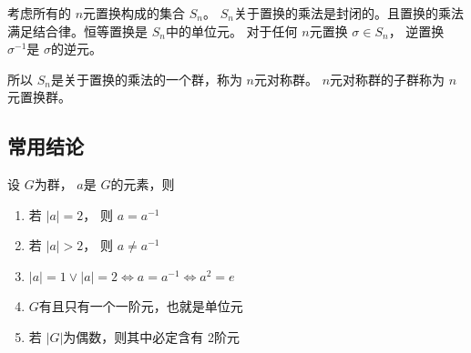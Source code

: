 \documentclass[a4paper,11pt]{article}%
\theoremstyle{remark}
\theoremstyle{remark}
\theoremstyle{definition}
\theoremstyle{definition}
\theoremstyle{plain}
\newcommand*{\abs}[1]{\lvert #1 \rvert}
\begin{document}
考虑所有的 $n$元置换构成的集合 $S_n$。 $S_n$关于置换的乘法是封闭的。且置换的乘法满足结合律。恒等置换是 $S_n$中的单位元。 对于任何 $n$元置换 $\sigma\in S_n$，
逆置换 $\sigma^{-1}$是 $\sigma$的逆元。

所以 $S_n$是关于置换的乘法的一个群，称为 $n$元对称群。 $n$元对称群的子群称为 $n$元置换群。
\subsection{常用结论}
设 $G$为群， $a$是 $G$的元素，则
\begin{enumerate}
    \item 若 $\abs{a}=2$， 则 $a=a^{-1}$
    \item 若 $\abs{a}>2$， 则 $a\neq a^{-1}$
    \item  $\abs{a}=1\lor\abs{a}=2\Leftrightarrow a=a^{-1}\Leftrightarrow a^2=e$
    \item $G$有且只有一个一阶元，也就是单位元
    \item 若 $\abs{G}$为偶数，则其中必定含有 2阶元
\end{enumerate}
\end{document}
